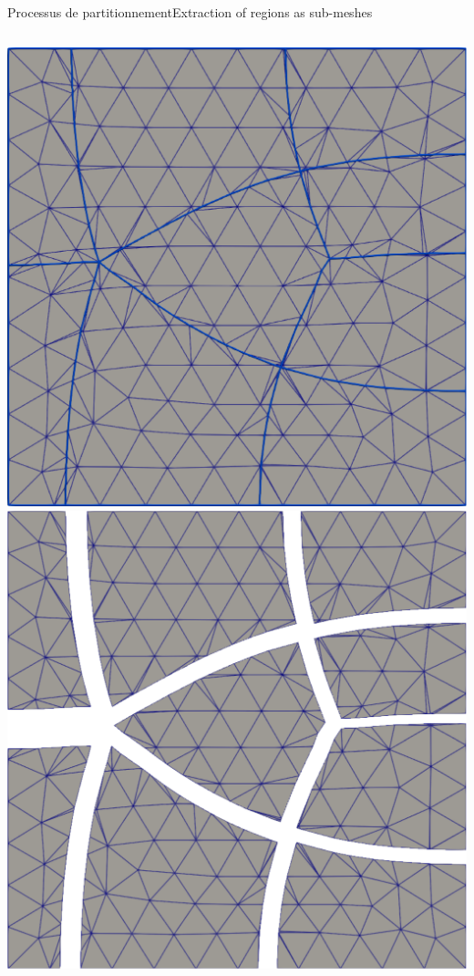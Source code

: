 \documentclass[compress,10pt,aspectratio=169]{beamer}
\begin{document}
\begin{frame}{Processus de partitionnement}{Extraction of regions as sub-meshes}
\begin{columns}

\begin{column}{0.7\textwidth}
\centering
\includegraphics[scale=0.14]{images/eclatement_2.pdf}
\hspace{0.3cm}
\includegraphics[scale=0.17]{images/eclatement_3.pdf}
\end{column}


\end{columns}
\end{frame}
\end{document}
